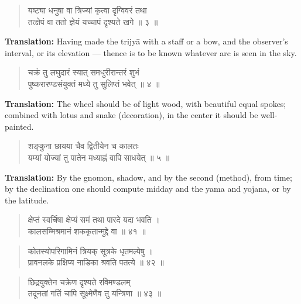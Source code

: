 \documentclass[11pt,a4paper]{article}
\newenvironment{shloka}{\begin{verse}\devanagarifont\large}{\end{verse}}
\begin{document}
\begin{shloka}
यष्ट्या धनुषा वा त्रिज्यां कृत्वा दृग्विवरं तथा \\
तत्क्षेपं वा ततो ज्ञेयं यच्चापं दृश्यते खगे ॥ ३ ॥
\end{shloka}

\textbf{Translation:}\quad
Having made the trijyā with a staff or a bow, and the observer's
interval, or its elevation — thence is to be known whatever arc is
seen in the sky.

\vspace{0.3cm}

\begin{shloka}
चक्रं तु लघुदारं स्यात् समधुरीरान्तरं शुभं \\
पुष्करारण्डसंयुक्तं मध्ये तु सुलिप्तं भवेत् ॥ ४ ॥
\end{shloka}

\textbf{Translation:}\quad
The wheel should be of light wood, with beautiful equal spokes;
combined with lotus and snake (decoration), in the center it should
be well-painted.

\vspace{0.3cm}

\begin{shloka}
शङ्कुना छायया चैव द्वितीयेन च कालतः \\
यम्यां योज्यां तु पातेन मध्याह्नं वापि साधयेत् ॥ ५ ॥
\end{shloka}

\textbf{Translation:}\quad
By the gnomon, shadow, and by the second (method), from time; by the
declination one should compute midday and the yama and yojana, or
by the latitude.

\vspace{0.3cm}

\begin{shloka}
क्षेप्तं स्वर्चिषा क्षेप्यं समं तथा पारदे यदा भवति ।\\
कालसम्मिश्रमानं शककृतान्मुद्दे वा ॥ ४१ ॥
\end{shloka}

\begin{shloka}
कोतस्योपरिगामिनं त्रियक् सूत्रके धृतमल्पेषु ।\\
प्रावनलके प्रक्षिप्य नाडिका श्रवति पतत्ये ॥ ४२ ॥
\end{shloka}

\vspace{0.3cm}

\begin{shloka}
छिद्रयुक्तेन चक्रेण दृश्यते रविमण्डलम् \\
तदूनतां गतिं चापि सूक्ष्मेणैव तु यन्त्रिणा ॥ ४३ ॥
\end{shloka}
\end{document}
